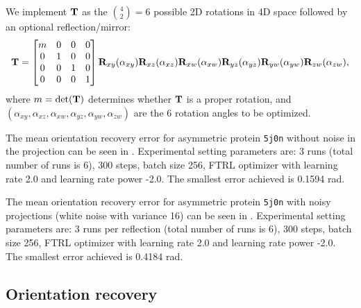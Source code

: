 We implement $\mathbf{T}$ as the $\binom{4}{2}=6$ possible 2D rotations in 4D space followed by an optional reflection/mirror:
\begin{equation*}
    \mathbf{T} =
    \begin{bmatrix}
        m & 0 & 0 & 0 \\
        0 & 1 & 0 & 0 \\
        0 & 0 & 1 & 0 \\
        0 & 0 & 0 & 1 \\
    \end{bmatrix}
    \mathbf{R}_{xy}(\alpha_{xy}) \mathbf{R}_{xz}(\alpha_{xz}) \mathbf{R}_{xw}(\alpha_{xw}) \mathbf{R}_{yz}(\alpha_{yz}) \mathbf{R}_{yw}(\alpha_{yw}) \mathbf{R}_{zw}(\alpha_{zw}),
\end{equation*}
where $m = \det(\mathbf{T})$ determines whether $\mathbf{T}$ is a proper rotation, and $(\alpha_{xy},\alpha_{xz},\alpha_{xw},\alpha_{yz},\alpha_{yw},\alpha_{zw})$ are the 6 rotation angles to be optimized.

The mean orientation recovery error for asymmetric protein \texttt{5j0n} without noise in the projection can be seen in .
Experimental setting parameters are: 3 runs   (total number of runs is 6), 300 steps, batch size 256, FTRL optimizer with learning rate 2.0 and learning rate power -2.0.
The smallest error achieved is 0.1594 rad.

The mean orientation recovery error for asymmetric protein \texttt{5j0n} with noisy projections (white noise with variance 16) can be seen in . Experimental setting parameters are: 3 runs per reflection (total number of runs is 6), 300 steps, batch size 256, FTRL optimizer with learning rate 2.0 and learning rate power -2.0. The smallest error achieved is 0.4184 rad.



\subsection{Orientation recovery}\label{sec:results:orientation-recovery}


